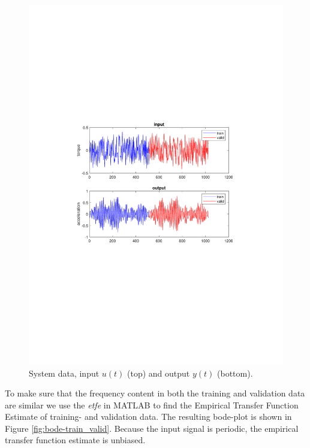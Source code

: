 \documentclass[]{article}
\begin{document}
\begin{figure}[ht]
\centering
\includegraphics[trim= 10cm 8cm 10cm 8cm, scale=0.4]{figures/input.pdf}
\caption{System data, input $u(t)$ (top) and output $y(t)$ (bottom).}
\label{fig:input}

\end{figure}
To make sure that the frequency content in both the training and validation data are similar we use the \emph{etfe} in MATLAB to find the Empirical Transfer Function Estimate of training- and validation data. The resulting bode-plot is shown in Figure \ref{fig:bode-train_valid}. Because the input signal is periodic, the empirical transfer function estimate is unbiased.
\end{document}
